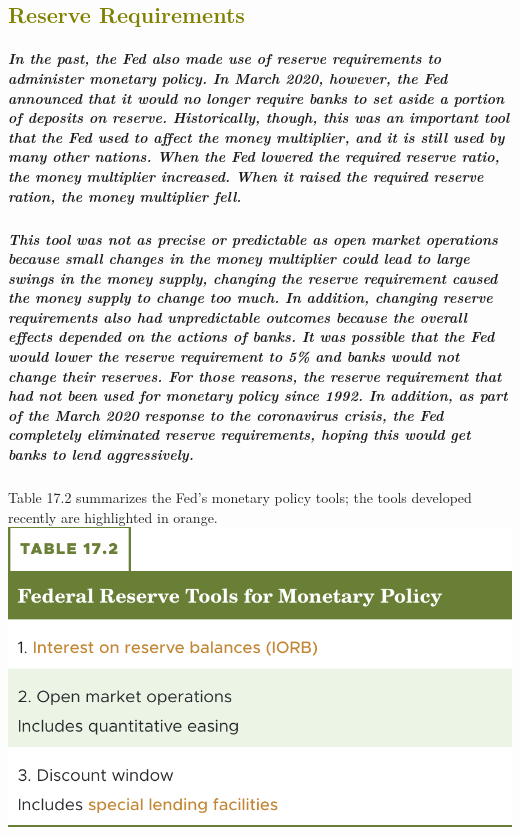 \documentclass[11pt]{article} %
\begin{document}
{\subsection*{\textcolor{olive}{Reserve Requirements}}
\subparagraph*{In the past, the Fed also made use of reserve requirements to administer monetary policy. In March 2020, however, the Fed announced that it would no longer require banks to set aside a portion of deposits on reserve. Historically, though, this was an important tool that the Fed used to affect the money multiplier, and it is still used by many other nations. When the Fed lowered the required reserve ratio, the money multiplier increased. When it raised the required reserve ration, the money multiplier fell.}
\subparagraph*{This tool was not as precise or predictable as open market operations because small changes in the money multiplier could lead to large swings in the money supply, changing the reserve requirement caused the money supply to change too much. In addition, changing reserve requirements also had unpredictable outcomes because the overall effects depended on the actions of banks. It was possible that the Fed would lower the reserve requirement to 5\% and banks would not change their reserves. For those reasons, the reserve requirement that had not been used for monetary policy since 1992. In addition, as part of the March 2020 response to the coronavirus crisis, the Fed completely eliminated reserve requirements, hoping this would get banks to lend aggressively.}
\begin{center}
Table 17.2 summarizes the Fed's monetary policy tools; the tools developed recently are highlighted in orange.\\
\includegraphics[scale=0.5]{images/Table 17.2.png} 
\end{center}

}
\end{document}
